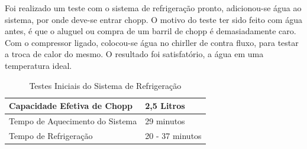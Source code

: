             Foi realizado um teste com o sistema de refrigeração pronto, adicionou-se água ao
            sistema, por onde deve-se entrar chopp. O motivo do teste ter sido feito com água
            antes, é que o aluguel ou compra de um barril de chopp é demasiadamente caro. Com
            o compressor ligado, colocou-se água no chirller de contra fluxo, para testar a troca de
            calor do mesmo. O resultado foi satisfatório, a água em uma temperatura ideal.

            \begin{table}[H]
                \centering
                \caption{Testes Iniciais do Sistema de Refrigeração}
                \label{testes-refrigeracao}
                \begin{tabular}{|l|l|}
                    \hline
                    Capacidade Efetiva de Chopp & 2,5 Litros \\ \hline
                    Tempo de Aquecimento do Sistema & 29 minutos \\ \hline
                    Tempo de Refrigeração &  20 - 37 minutos\\ \hline
                \end{tabular}
            \end{table}